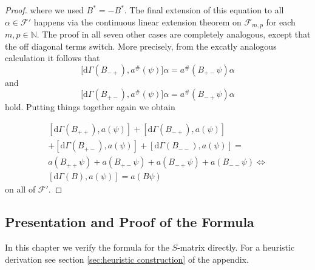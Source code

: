 \documentclass[b5paper,draft,openbib,12pt]{memoir}
\begin{document}
\begin{proof}
where we used \(B^*=-B^*\).  
The final extension of this equation to all \(\alpha \in \mathcal{F}'\) happens via the continuous linear
extension theorem on \(\mathcal{F}_{m,p}\) for each \(m,p\in\mathbb{N}\). 
The proof in all seven other cases are completely analogous,
except that the off diagonal terms switch. More precisely, from the excatly analogous 
calculation it follows that 
\begin{equation}
  \big[\mathrm{d}\Gamma(B_{-+}),a^\#(\psi)\big]\alpha=a^\#\left(B_{+-}\psi\right)\alpha
\end{equation}  
and 
\begin{equation}
  \big[\mathrm{d}\Gamma(B_{+-}),a^\#(\psi)\big]\alpha=a^\#\left(B_{-+}\psi\right)\alpha
\end{equation}  
hold.
Putting things together again we obtain

\begin{align}
\left[ \mathrm{d}\Gamma(B_{++}),a(\psi) \right] +\left[ \mathrm{d}\Gamma(B_{-+}),a(\psi) \right] \\
+\left[ \mathrm{d}\Gamma(B_{+-}),a(\psi) \right] +\left[ \mathrm{d}\Gamma(B_{--}),a(\psi) \right]  =\\
a(B_{++}\psi)+a(B_{+-}\psi)+a(B_{-+}\psi)+a(B_{--}\psi)\iff \\
\left[ \mathrm{d}\Gamma(B),a(\psi) \right] =a(B\psi)
\end{align}
on all of \(\mathcal{F}'\).

\end{proof}

 

\subsection{Presentation and Proof of the Formula}\label{sec:proof simple formula}

In this chapter we verify the formula for the \(S\)-matrix directly.
For a heuristic derivation see 
section \ref{sec:heuristic construction} of the 
appendix.
\end{document}
